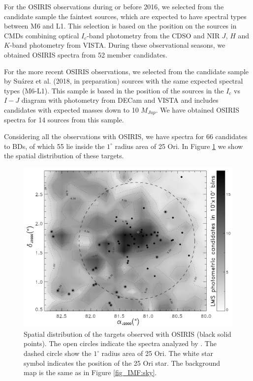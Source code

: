 \documentclass[12pt]{article}
\newcounter{subsubsubsection}[subsubsection]
\begin{document}
\label{sec_OSIRIS:targets}
For the OSIRIS observations during or before 2016, we selected from the \citet{Downes2015} candidate sample the faintest sources, which are expected to have spectral types between M6 and L1. This selection is based on the position on the sources in CMDs combining optical $I_c$-band photometry from the CDSO and NIR $J$, $H$ and $K$-band photometry from VISTA. During these observational seasons, we obtained OSIRIS spectra from 52 member candidates.

For the more recent OSIRIS observations, we selected from the candidate sample by Su\'arez et al. (2018, in preparation) sources with the same expected spectral types (M6-L1). This sample is based in the position of the sources in the $I_c$ vs $I-J$ diagram with photometry from DECam and VISTA and includes candidates with expected masses down to 10 $M_{Jup}$. We have obtained OSIRIS spectra for 14 sources from this sample.%

Considering all the observations with OSIRIS, we have spectra for 66 candidates to BDs, of which 55 lie inside the $1^\circ$ radius area of 25 Ori. In Figure \ref{fig_OSIRIS:sky} we show the spatial distribution of these targets. 

\begin{figure}[ht!]
	\includegraphics[width=1.0\textwidth]{sky_OSIRIS.pdf}
	\caption[Spatial distribution of the OSIRIS targets.]{Spatial distribution of the targets observed with OSIRIS (black solid points). The open circles indicate the spectra analyzed by \citet{Downes2015}. The dashed circle show the $1^\circ$ radius area of 25 Ori. The white star symbol indicates the position of the 25 Ori star. The background map is the same as in Figure \ref{fig_IMF:sky}.}
	\label{fig_OSIRIS:sky}
\end{figure}
\end{document}
